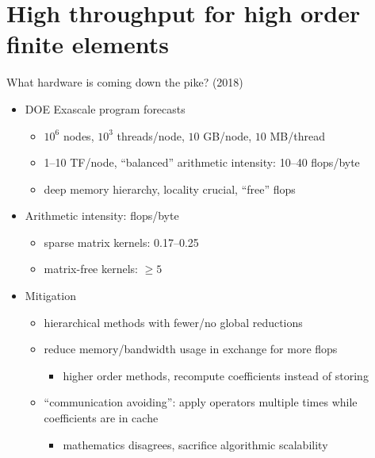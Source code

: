 \documentclass{beamer}
\begin{document}
\section{High throughput for high order finite elements}
\begin{frame}{What hardware is coming down the pike? (2018)}
  \begin{itemize}
  \item DOE Exascale program forecasts
    \begin{itemize}
    \item $10^6$ nodes, $10^3$ threads/node, $10$ GB/node, $10$ MB/thread
    \item 1--10 TF/node, \alert<2->{``balanced'' arithmetic intensity: 10--40 flops/byte}
    \item deep memory hierarchy, locality crucial, ``free'' flops
    \end{itemize}
  \item Arithmetic intensity: flops/byte
  \begin{itemize}
  \item sparse matrix kernels: 0.17--0.25
  \item matrix-free kernels: $\ge 5$
  \end{itemize}
\item Mitigation
  \begin{itemize}
  \item hierarchical methods with fewer/no global reductions
  \item reduce memory/bandwidth usage in exchange for more flops
    \begin{itemize}
    \item \alert<3>{higher order methods, recompute coefficients instead of storing}
    \end{itemize}
  \item ``communication avoiding'': apply operators multiple times while coefficients are in cache
    \begin{itemize}
    \item mathematics disagrees, sacrifice algorithmic scalability
    \end{itemize}
  \end{itemize}
\end{itemize}
\end{frame}




% 
% 
\end{document}
